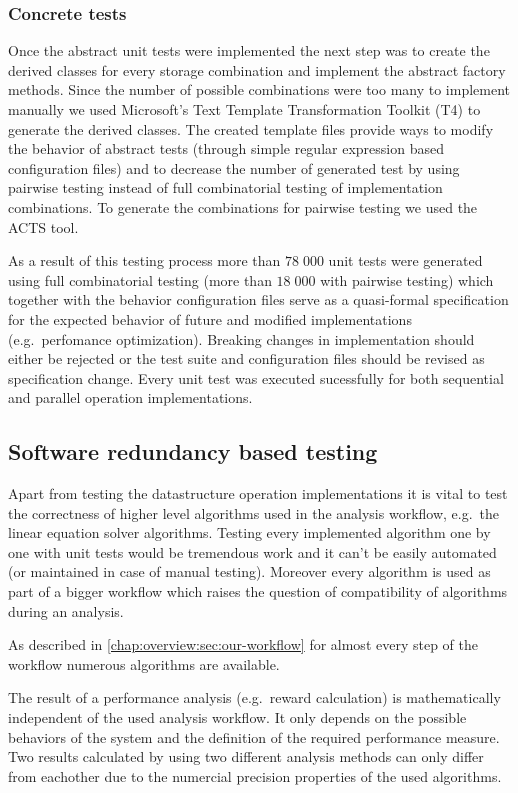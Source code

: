 \subsubsection{Concrete tests}

Once the abstract unit tests were implemented the next step was to create the derived classes for every storage combination and implement the abstract factory methods. Since the number of possible combinations were too many to implement manually we used Microsoft's Text Template Transformation Toolkit (T4) to generate the derived classes. The created template files provide ways to modify the behavior of abstract tests (through simple regular expression based configuration files) and to decrease the number of generated test by using pairwise testing instead of full combinatorial testing of implementation combinations. To generate the combinations for pairwise testing we used the ACTS tool. 

As a result of this testing process more than $78\;000$ unit tests were generated using full combinatorial testing (more than $18\;000$ with pairwise testing) which together with the behavior configuration files serve as a quasi-formal specification for the expected behavior of future and modified implementations (e.g.\ perfomance optimization). Breaking changes in implementation should either be rejected or the test suite and configuration files should be revised as specification change. Every unit test was executed sucessfully for both sequential and parallel operation implementations.

\subsection{Software redundancy based testing}

Apart from testing the datastructure operation implementations it is vital to test the correctness of higher level algorithms used in the analysis workflow, e.g.\ the linear equation solver algorithms. Testing every implemented algorithm one by one with unit tests would be tremendous work and it can't be easily automated (or maintained in case of manual testing). Moreover every algorithm is used as part of a bigger workflow which raises the question of compatibility of algorithms during an analysis. 

As described in \cref{chap:overview:sec:our-workflow} for almost every step of the workflow numerous algorithms are available.

\begin{obs}
  \label{obs:evaluation:reward-results}
  The result of a performance analysis (e.g.\ reward calculation) is mathematically independent of the used analysis workflow. It only depends on the possible behaviors of the system and the definition of the required performance measure. Two results calculated by using two different analysis methods can only differ from eachother due to the numercial precision properties of the used algorithms.
\end{obs}  

